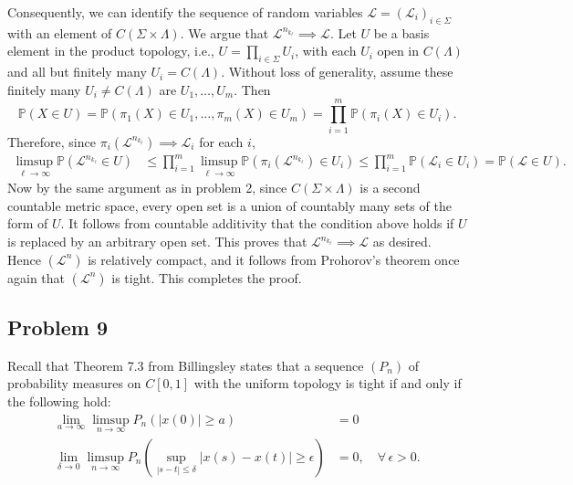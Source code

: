 \documentclass[12pt]{article}
\begin{document}
		Consequently, we can identify the sequence of random variables $\mathcal{L} = (\mathcal{L}_i)_{i\in\Sigma}$ with an element of $C(\Sigma\times\Lambda)$. We argue that $\mathcal{L}^{n_{k_\ell}}\implies \mathcal{L}$. Let $U$ be a basis element in the product topology, i.e., $U = \prod_{i\in\Sigma} U_i$, with each $U_i$ open in $C(\Lambda)$ and all but finitely many $U_i = C(\Lambda)$. Without loss of generality, assume these finitely many $U_i\neq C(\Lambda)$ are $U_1,\dots,U_m$. Then
		\[
		\mathbb{P}(X \in U) = \mathbb{P}(\pi_1(X) \in U_1, \dots, \pi_m(X) \in U_m) = \prod_{i=1}^m \mathbb{P}(\pi_i(X)\in U_i).
		\]
		Therefore, since $\pi_i(\mathcal{L}^{n_{k_\ell}}) \implies \mathcal{L}_i$ for each $i$,
		\begin{align*}
		\limsup_{\ell\to\infty} \mathbb{P}(\mathcal{L}^{n_{k_\ell}} \in U) &\leq \prod_{i=1}^m \limsup_{\ell\to\infty} \mathbb{P}(\pi_i(\mathcal{L}^{n_{k_\ell}})\in U_i) \leq \prod_{i=1}^m \mathbb{P}(\mathcal{L}_i \in U_i) = \mathbb{P}(\mathcal{L}\in U).
		\end{align*}
		Now by the same argument as in problem 2, since $C(\Sigma\times\Lambda)$ is a second countable metric space, every open set is a union of countably many sets of the form of $U$. It follows from countable additivity that the condition above holds if $U$ is replaced by an arbitrary open set. This proves that $\mathcal{L}^{n_{k_\ell}} \implies \mathcal{L}$ as desired. Hence $(\mathcal{L}^n)$ is relatively compact, and it follows from Prohorov's theorem  once again that $(\mathcal{L}^n)$ is tight. This completes the proof.
		
	
	\subsection*{Problem 9}
	
		Recall that Theorem 7.3 from Billingsley states that a sequence $(P_n)$ of probability measures on $C[0,1]$ with the uniform topology is tight if and only if the following hold:
		\begin{align}
			\lim_{a\to\infty} \limsup_{n\to\infty} P_n(|x(0)|\geq a) &= 0 \\
			\lim_{\delta\to 0} \limsup_{n\to\infty} P_n\left(\sup_{|s-t|\leq\delta} |x(s)-x(t)| \geq \epsilon\right) &= 0, \quad \forall\,\epsilon>0.
		\end{align}
		
\end{document}
